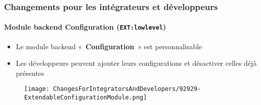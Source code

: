 %

\begin{frame}[fragile]
	\frametitle{Changements pour les intégrateurs et développeurs}
	\framesubtitle{Module backend Configuration (\texttt{EXT:lowlevel})}

	\lstset{basicstyle=\tiny\ttfamily}

	\begin{itemize}
		\item Le module backend «~\textbf{Configuration}~» est personnalisable
		\item Les développeurs peuvent ajouter leurs configurations et désactiver celles déjà présentes
	\end{itemize}

	\begin{figure}
		\texttt{[image: ChangesForIntegratorsAndDevelopers/92929-ExtendableConfigurationModule.png]}
	\end{figure}

\end{frame}


